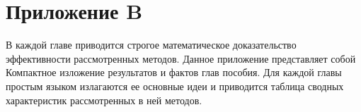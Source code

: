 

\newpage
{}
\pagestyle{empty}
\chapter*{Приложение B}
\vspace{0.5cm}

В каждой главе приводится строгое математическое доказательство эффективности рассмотренных методов. Данное приложение представляет собой Компактное изложение результатов и фактов глав пособия. Для каждой главы простым языком излагаются ее основные идеи и приводится таблица сводных характеристик рассмотренных в ней методов.






